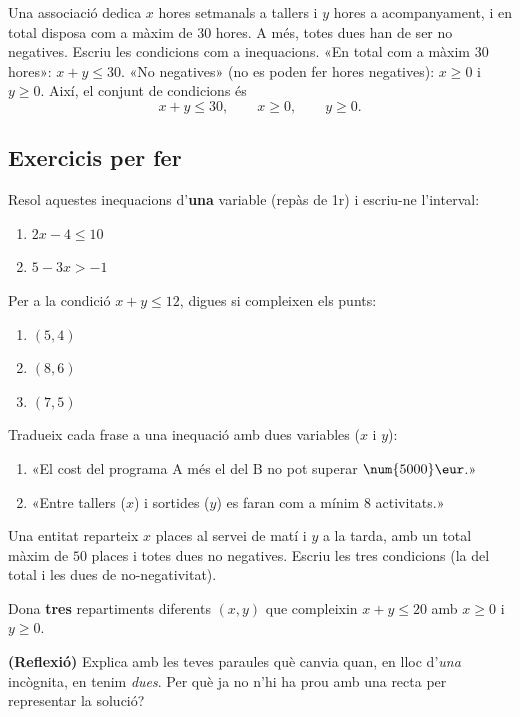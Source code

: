 \begin{exresolt}
Una associació dedica $x$ hores setmanals a tallers i $y$ hores a acompanyament, i en
total disposa com a màxim de $30$ hores. A més, totes dues han de ser no negatives.
Escriu les condicions com a inequacions.
\solucio
«En total com a màxim $30$ hores»: $x+y\le 30$. «No negatives» (no es poden fer hores
negatives): $x\ge 0$ i $y\ge 0$. Així, el conjunt de condicions és
\[
x+y\le 30,\qquad x\ge 0,\qquad y\ge 0.
\]
\end{exresolt}

\subsection{Exercicis per fer}

\begin{exercicis}
\begin{exlist}
  \item Resol aquestes inequacions d'\textbf{una} variable (repàs de 1r) i escriu-ne
        l'interval:
        \begin{enumerate}[label=\alph*), leftmargin=1.6em, topsep=2pt]
          \item $2x-4\le 10$ \hfill \item $5-3x>-1$
        \end{enumerate}
  \item Per a la condició $x+y\le 12$, digues si compleixen els punts:
        \begin{enumerate}[label=\alph*), leftmargin=1.6em, topsep=2pt]
          \item $(5,4)$ \hfill \item $(8,6)$ \hfill \item $(7,5)$
        \end{enumerate}
  \item Tradueix cada frase a una inequació amb dues variables ($x$ i $y$):
        \begin{enumerate}[label=\alph*), leftmargin=1.6em, topsep=2pt]
          \item «El cost del programa A més el del B no pot superar $\num{5000}\eur$.»
          \item «Entre tallers ($x$) i sortides ($y$) es faran com a mínim $8$ activitats.»
        \end{enumerate}
  \item Una entitat reparteix $x$ places al servei de matí i $y$ a la tarda, amb un
        total màxim de $50$ places i totes dues no negatives. Escriu les tres
        condicions (la del total i les dues de no-negativitat).
  \item Dona \textbf{tres} repartiments diferents $(x,y)$ que compleixin
        $x+y\le 20$ amb $x\ge 0$ i $y\ge 0$.
  \item \textbf{(Reflexió)} Explica amb les teves paraules què canvia quan, en lloc
        d'\emph{una} incògnita, en tenim \emph{dues}. Per què ja no n'hi ha prou amb
        una recta per representar la solució?
\end{exlist}
\end{exercicis}


